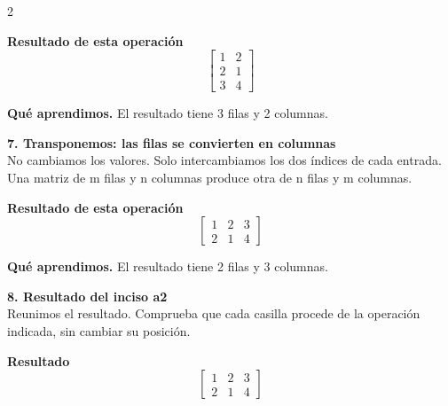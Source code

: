 \documentclass[11pt,a4paper,landscape]{article}
\begin{document}
\begin{multicols*}{2}
\begin{minipage}{\linewidth}
\par\smallskip \textbf{Resultado de esta operación}\[\begin{bmatrix}1 & 2\\2 & 1\\3 & 4\end{bmatrix}\]
\par\smallskip\textbf{Qué aprendimos.} El resultado tiene 3 filas y 2 columnas.
\end{minipage}\par\medskip
\noindent\begin{minipage}{\linewidth}\textbf{7. Transponemos: las filas se convierten en columnas}\\[2pt]No cambiamos los valores. Solo intercambiamos los dos índices de cada entrada. Una matriz de m filas y n columnas produce otra de n filas y m columnas.
\par{}\par\smallskip
\par\smallskip \textbf{Resultado de esta operación}\[\begin{bmatrix}1 & 2 & 3\\2 & 1 & 4\end{bmatrix}\]
\par\smallskip\textbf{Qué aprendimos.} El resultado tiene 2 filas y 3 columnas.
\end{minipage}\par\medskip
\noindent\begin{minipage}{\linewidth}\textbf{8. Resultado del inciso a2}\\[2pt]Reunimos el resultado. Comprueba que cada casilla procede de la operación indicada, sin cambiar su posición.
\par\smallskip \textbf{Resultado}\[\begin{bmatrix}1 & 2 & 3\\2 & 1 & 4\end{bmatrix}\]

\end{minipage}
\end{multicols*}
\end{document}

